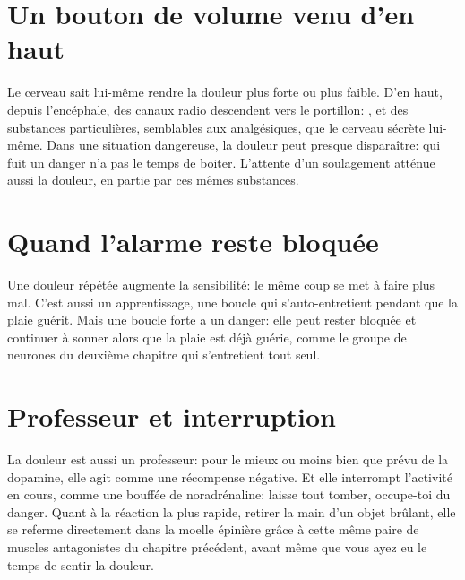 
\section*{Un bouton de volume venu d'en haut}

Le cerveau sait lui-même rendre la douleur plus forte ou plus faible. D'en haut, depuis l'encéphale, des canaux radio descendent vers le portillon: ,  et des substances particulières, semblables aux analgésiques, que le cerveau sécrète lui-même. Dans une situation dangereuse, la douleur peut presque disparaître: qui fuit un danger n'a pas le temps de boiter. L'attente d'un soulagement atténue aussi la douleur, en partie par ces mêmes substances.

\section*{Quand l'alarme reste bloquée}

Une douleur répétée augmente la sensibilité: le même coup se met à faire plus mal. C'est aussi un apprentissage, une boucle qui s'auto-entretient pendant que la plaie guérit. Mais une boucle forte a un danger: elle peut \og rester bloquée\fg{} et continuer à sonner alors que la plaie est déjà guérie, comme le groupe de neurones du deuxième chapitre qui s'entretient tout seul.

\section*{Professeur et interruption}

La douleur est aussi un professeur: pour le \og mieux ou moins bien que prévu\fg{} de la dopamine, elle agit comme une récompense négative. Et elle interrompt l'activité en cours, comme une bouffée de noradrénaline: laisse tout tomber, occupe-toi du danger. Quant à la réaction la plus rapide, retirer la main d'un objet brûlant, elle se referme directement dans la moelle épinière grâce à cette même paire de muscles antagonistes du chapitre précédent, avant même que vous ayez eu le temps de sentir la douleur.

